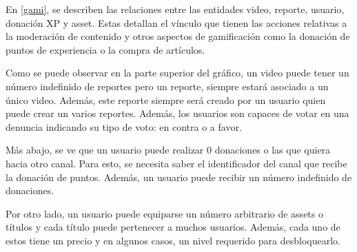 En \ref{gami}, se describen las relaciones entre las entidades video, reporte, usuario, donación XP y asset. Estas detallan el vínculo que tienen las acciones relativas a la moderación de contenido y otros aspectos de gamificación como la donación de puntos de experiencia o la compra de artículos. 

Como se puede observar en la parte superior del gráfico, un video puede tener un número indefinido de reportes pero un reporte, siempre estará asociado a un único video. Además, este reporte siempre será creado por un usuario quien puede crear un varios reportes. Además, los usuarios son capaces de votar en una denuncia indicando su tipo de voto: en contra o a favor. 

Más abajo, se ve que un usuario puede realizar 0 donaciones o las que quiera hacia otro canal. Para esto, se necesita saber el identificador del canal que recibe la donación de puntos. Además, un usuario puede recibir un número indefinido de donaciones. 

Por otro lado, un usuario puede equiparse un número arbitrario de assets o títulos y cada título puede pertenecer a muchos usuarios. Además, cada uno de estos tiene un precio y en algunos casos, un nivel requerido para desbloquearlo.   


\FloatBarrier
\clearpage